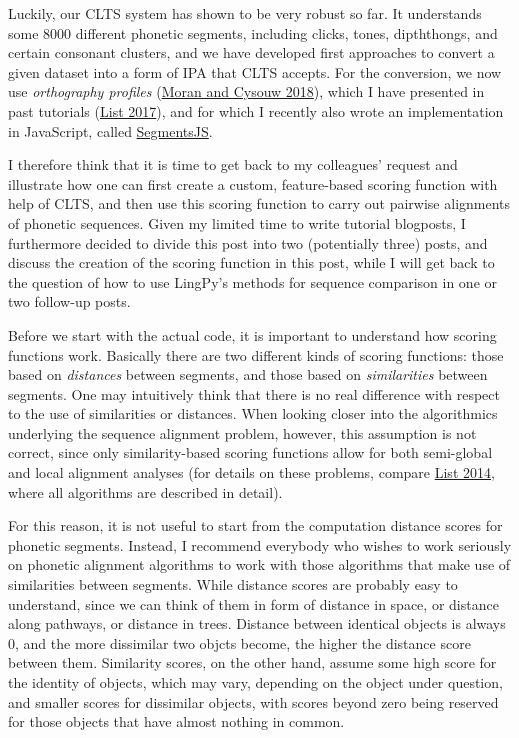 \documentclass[
  a4paper,
  14pt,
  oneside,
  tablecaptionabove
]{scrbook}
\begin{document}
Luckily, our CLTS system has shown to be very robust so far. It
understands some 8000 different phonetic segments, including clicks,
tones, dipththongs, and certain consonant clusters, and we have
developed first approaches to convert a given dataset into a form of IPA
that CLTS accepts. For the conversion, we now use \emph{orthography
profiles} (\href{http://bibliography.lingpy.org?key=Moran2018}{Moran
and Cysouw 2018}), which I have presented in past tutorials (\href{http://bibliography.lingpy.org?key=List2017LECTUREd}{List 2017}),
and for which I recently also wrote an implementation in JavaScript,
called \href{http://calc.digling.org/}{SegmentsJS}.

I therefore think that it is time to get back to my colleagues' request
and illustrate how one can first create a custom, feature-based scoring
function with help of CLTS, and then use this scoring function to carry
out pairwise alignments of phonetic sequences. Given my limited time to
write tutorial blogposts, I furthermore decided to divide this post into
two (potentially three) posts, and discuss the creation of the scoring
function in this post, while I will get back to the question of how to
use LingPy's methods for sequence comparison in one or two follow-up
posts.

Before we start with the actual code, it is important to understand how
scoring functions work. Basically there are two different kinds of
scoring functions: those based on \emph{distances} between segments, and
those based on \emph{similarities} between segments. One may intuitively
think that there is no real difference with respect to the use of
similarities or distances. When looking closer into the algorithmics
underlying the sequence alignment problem, however, this assumption is
not correct, since only similarity-based scoring functions allow for
both semi-global and local alignment analyses (for details on these
problems, compare
\href{http://bibliography.lingpy.org?key=List2014d}{List 2014}, where
all algorithms are described in detail).

For this reason, it is not useful to start from the computation distance
scores for phonetic segments. Instead, I recommend everybody who wishes
to work seriously on phonetic alignment algorithms to work with those
algorithms that make use of similarities between segments. While
distance scores are probably easy to understand, since we can think of
them in form of distance in space, or distance along pathways, or
distance in trees. Distance between identical objects is always 0, and
the more dissimilar two objcts become, the higher the distance score
between them. Similarity scores, on the other hand, assume some high
score for the identity of objects, which may vary, depending on the
object under question, and smaller scores for dissimilar objects, with
scores beyond zero being reserved for those objects that have almost
nothing in common.
\end{document}
